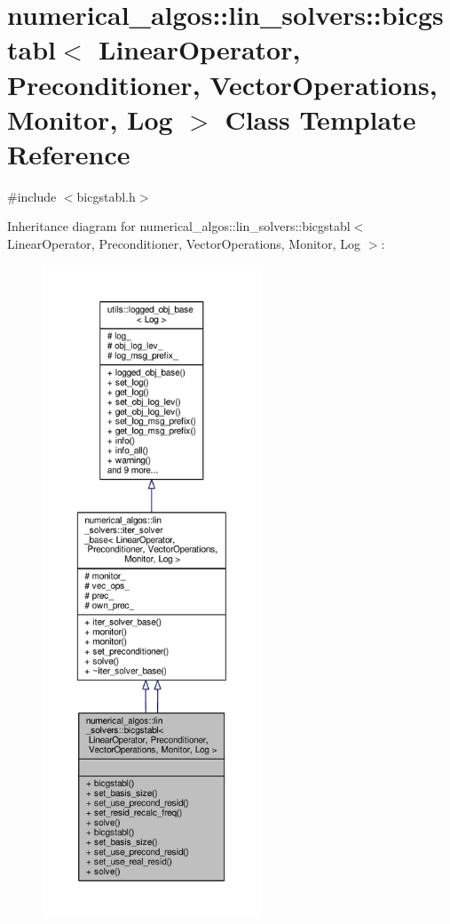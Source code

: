 \hypertarget{classnumerical__algos_1_1lin__solvers_1_1bicgstabl}{\section{numerical\-\_\-algos\-:\-:lin\-\_\-solvers\-:\-:bicgstabl$<$ Linear\-Operator, Preconditioner, Vector\-Operations, Monitor, Log $>$ Class Template Reference}
\label{classnumerical__algos_1_1lin__solvers_1_1bicgstabl}
}


{\ttfamily \#include $<$bicgstabl.\-h$>$}



Inheritance diagram for numerical\-\_\-algos\-:\-:lin\-\_\-solvers\-:\-:bicgstabl$<$ Linear\-Operator, Preconditioner, Vector\-Operations, Monitor, Log $>$\-:\nopagebreak
\begin{figure}[H]
\begin{center}
\leavevmode
\includegraphics[height=550pt]{classnumerical__algos_1_1lin__solvers_1_1bicgstabl__inherit__graph}
\end{center}
\end{figure}



